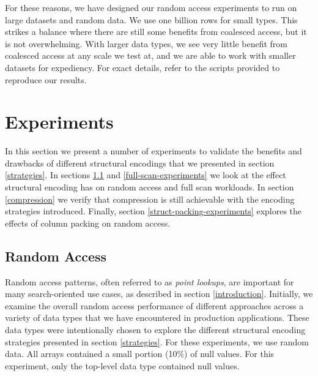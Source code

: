\documentclass[sigconf, nonacm]{acmart}
\begin{document}
For these reasons, we have designed our random access experiments to run on large datasets and random data.  We use one billion rows for small types.  This strikes a balance where there are still some benefits from coalesced access, but it is not overwhelming.  With larger data types, we see very little benefit from coalesced access at any scale we test at, and we are able to work with smaller datasets for expediency.  For exact details, refer to the scripts provided to reproduce our results.

\section{Experiments}

In this section we present a number of experiments to validate the benefits and drawbacks of different structural encodings that we presented in section \ref{strategies}.  In sections \ref{random-access-experiments} and \ref{full-scan-experiments} we look at the effect structural encoding has on random access and full scan workloads.  In section \ref{compression} we verify that compression is still achievable with the encoding strategies introduced.  Finally, section \ref{struct-packing-experiments} explores the effects of column packing on random access.

\subsection{Random Access} \label{random-access-experiments}

Random access patterns, often referred to as \textit{point lookups}, are important for many search-oriented use cases, as described in section \ref{introduction}.  Initially, we examine the overall random access performance of different approaches across a variety of data types that we have encountered in production applications.  These data types were intentionally chosen to explore the different structural encoding strategies presented in section \ref{strategies}.  For these experiments, we use random data.  All arrays contained a small portion (10\%) of null values.  For this experiment, only the top-level data type contained null values.
\end{document}
